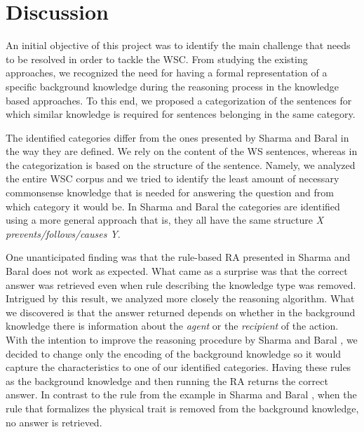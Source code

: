 \section{Discussion}
\label{section:Discussion}

An initial objective of this project was to identify the main challenge that needs to be resolved in order to tackle the WSC. From studying the existing approaches, we recognized the need for having a formal representation of a specific background knowledge during the reasoning process in the knowledge based approaches. To this end, we proposed a categorization of the sentences for which similar knowledge is required for sentences belonging in the same category.

\begin{comment}
Emphasize these two
1. our categories are content based -> a combination of categories and knowledge about them could be a future work
2. we tried to identify the least amount of necessary commonsense knowledge (due to efficiency), which can consist of various different knowledge(s), that can exclude each other
\end{comment}

The identified categories differ from the ones presented by Sharma and Baral \cite{2018CommonsenseKT} in the way they are defined. We rely on the content of the WS sentences, whereas in \cite{2018CommonsenseKT} the categorization is based on the structure of the sentence. Namely, we analyzed the entire WSC corpus and we tried to identify the least amount of necessary commonsense knowledge that is needed for answering the question and from which category it would be.  In Sharma and Baral \cite{2018CommonsenseKT} the categories are identified using a more general approach that is, they all have the same structure \textit{X prevents/follows/causes Y}. 

One unanticipated finding was that the rule-based RA presented in Sharma and Baral \cite{2018CommonsenseKT} does not work as expected. What came as a surprise was that the correct answer was retrieved even when rule describing the knowledge type was removed. Intrigued by this result, we analyzed more closely the reasoning algorithm. What we discovered is that the answer returned depends on whether in the background knowledge there is information about the \textit{agent} or the \textit{recipient} of the action. With the intention to improve the reasoning procedure by  Sharma and Baral \cite{2018CommonsenseKT}, we decided to change only the encoding of the background knowledge so it would capture the characteristics to one of our identified categories. Having these rules as the background knowledge and then running the RA returns the correct answer. In contrast to the rule from the example in Sharma and Baral \cite{2018CommonsenseKT}, when the rule that formalizes the physical trait is removed from the background knowledge, no answer is retrieved. 

